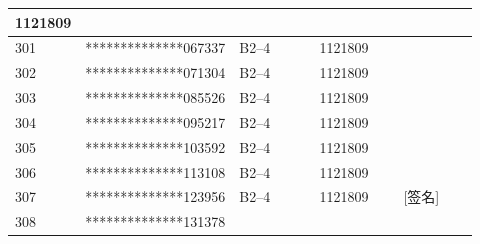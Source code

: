 \documentclass[UTF8,10pt,a4paper,fontset=fandol]{ctexart}
\newcommand{\fieldvalue}[1]{#1}
\newcommand{\handwritten}[1]{#1}
\begin{document}
\begin{tabular}{|p{0.08\linewidth}|p{0.28\linewidth}|p{0.19\linewidth}|p{0.19\linewidth}|p{0.18\linewidth}|}
\fieldvalue{1121809} & \\ \hline
301 &
\fieldvalue{**************067337} &
\fieldvalue{B2--4} &
\fieldvalue{1121809} & \\ \hline
302 &
\fieldvalue{**************071304} &
\fieldvalue{B2--4} &
\fieldvalue{1121809} & \\ \hline
303 &
\fieldvalue{**************085526} &
\fieldvalue{B2--4} &
\fieldvalue{1121809} & \\ \hline
304 &
\fieldvalue{**************095217} &
\fieldvalue{B2--4} &
\fieldvalue{1121809} & \\ \hline
305 &
\fieldvalue{**************103592} &
\fieldvalue{B2--4} &
\fieldvalue{1121809} & \\ \hline
306 &
\fieldvalue{**************113108} &
\fieldvalue{B2--4} &
\fieldvalue{1121809} & \\ \hline
307 &
\fieldvalue{**************123956} &
\fieldvalue{B2--4} &
\fieldvalue{1121809} &
\fieldvalue{\handwritten{[签名]}} \\ \hline
308 &
\fieldvalue{**************131378} &

\end{tabular}
\end{document}

